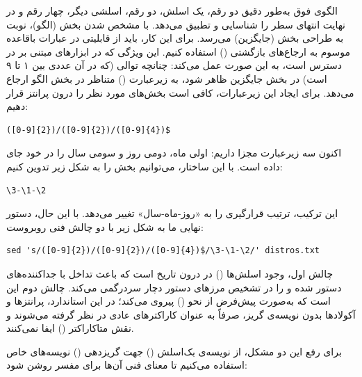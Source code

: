 الگوی فوق به‌طور دقیق دو رقم، یک اسلش، دو رقم، اسلشی دیگر، چهار رقم و در نهایت انتهای سطر را شناسایی و تطبیق می‌دهد. با مشخص شدن بخش  (الگو)، نوبت به طراحی بخش  (جایگزین) می‌رسد. برای این کار، باید از قابلیتی در عبارات باقاعده موسوم به ارجاع‌های بازگشتی () استفاده کنیم. این ویژگی که در ابزارهای مبتنی بر  در دسترس است، به این صورت عمل می‌کند: چنانچه توالی  (که در آن  عددی بین ۱ تا ۹ است) در بخش جایگزین ظاهر شود، به زیرعبارت () متناظر در بخش الگو ارجاع می‌دهد. برای ایجاد این زیرعبارات، کافی است بخش‌های مورد نظر را درون پرانتز قرار دهیم:

\begin{latin}
\begin{lstlisting}
([0-9]{2})/([0-9]{2})/([0-9]{4})$
\end{lstlisting}
\end{latin}

اکنون سه زیرعبارت مجزا داریم: اولی ماه، دومی روز و سومی سال را در خود جای داده است. با این ساختار، می‌توانیم بخش  را به شکل زیر تدوین کنیم:

\begin{latin}
\begin{lstlisting}
\3-\1-\2
\end{lstlisting}
\end{latin}

این ترکیب، ترتیب قرارگیری را به «روز-ماه-سال» تغییر می‌دهد. با این حال، دستور نهایی ما به شکل زیر با دو چالش فنی روبروست:

\begin{latin}
\begin{lstlisting}
sed 's/([0-9]{2})/([0-9]{2})/([0-9]{4})$/\3-\1-\2/' distros.txt
\end{lstlisting}
\end{latin}

چالش اول، وجود اسلش‌ها (\cmd{/}) در درون تاریخ است که باعث تداخل با جداکننده‌های دستور  شده و  را در تشخیص مرزهای دستور دچار سردرگمی می‌کند. چالش دوم این است که  به‌صورت پیش‌فرض از نحو  () پیروی می‌کند؛ در این استاندارد، پرانتزها و آکولادها بدون نویسه‌ی گریز، صرفاً به عنوان کاراکترهای عادی در نظر گرفته می‌شوند و نقش متاکاراکتر () ایفا نمی‌کنند.

برای رفع این دو مشکل، از نویسه‌ی بک‌اسلش (\cmd{\textbackslash}) جهت گریزدهی () نویسه‌های خاص استفاده می‌کنیم تا معنای فنی آن‌ها برای مفسر روشن شود:

